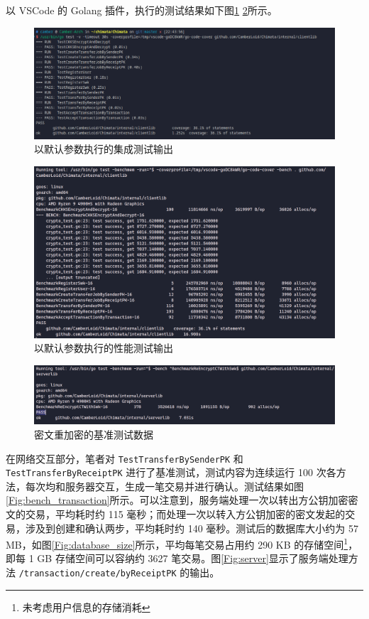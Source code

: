 以 VSCode 的 Golang 插件，执行的测试结果如下图\ref{Fig:test} \ref{Fig:benchmark}所示。

\begin{figure}[ht]
    \centering
    \includegraphics[width=0.9\linewidth]{./Figures/Test.png}
    \caption{以默认参数执行的集成测试输出}\label{Fig:test}
\end{figure}

\begin{figure}[ht]
    \centering
    \includegraphics[width=0.9\linewidth]{./Figures/Bench_Overall.png}
    \caption{以默认参数执行的性能测试输出}\label{Fig:benchmark}
\end{figure}

\begin{figure}
    \centering
    \includegraphics[width=0.8\linewidth]{./Figures/Bench_ReEncrypt.png}
    \caption{密文重加密的基准测试数据}\label{Fig:bench_reencrypt}
\end{figure}

在网络交互部分，笔者对 \verb|TestTransferBySenderPK| 和 \verb|TestTransferByReceiptPK| 进行了基准测试，测试内容为连续运行 100 次各方法，每次均和服务器交互，生成一笔交易并进行确认。测试结果如图\ref{Fig:bench_transaction}所示。可以注意到，服务端处理一次以转出方公钥加密密文的交易，平均耗时约 115 毫秒；而处理一次以转入方公钥加密的密文发起的交易，涉及到创建和确认两步，平均耗时约 140 毫秒。测试后的数据库大小约为 57 MB，如图\ref{Fig:database_size}所示，平均每笔交易占用约 290 KB 的存储空间\footnote{未考虑用户信息的存储消耗}，即每 1 GB 存储空间可以容纳约 3627 笔交易。图\ref{Fig:server}显示了服务端处理方法 \verb|/transaction/create/byReceiptPK| 的输出。

